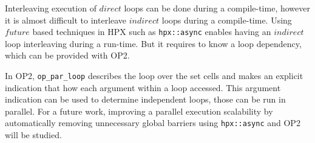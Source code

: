 \documentclass[conference]{IEEEtran}
\begin{document}
Interleaving execution of $direct$ loops can be done during a compile-time, however it is almost difficult to interleave $indirect$ loops during a compile-time. Using $future$ based techniques in HPX such as \texttt{hpx::async} enables having an $indirect$ loop interleaving during a run-time. But it requires to know a loop dependency, which can be provided with OP2. 

In OP2, \texttt{op\_par\_loop} describes the loop over the set cells and makes an explicit indication that how each argument within a loop accessed. This argument indication can be used to determine independent loops, those can be run in parallel. For a future work, improving a parallel execution scalability by automatically removing unnecessary global barriers using \texttt{hpx::async} and OP2 will be studied. 




\end{document}
